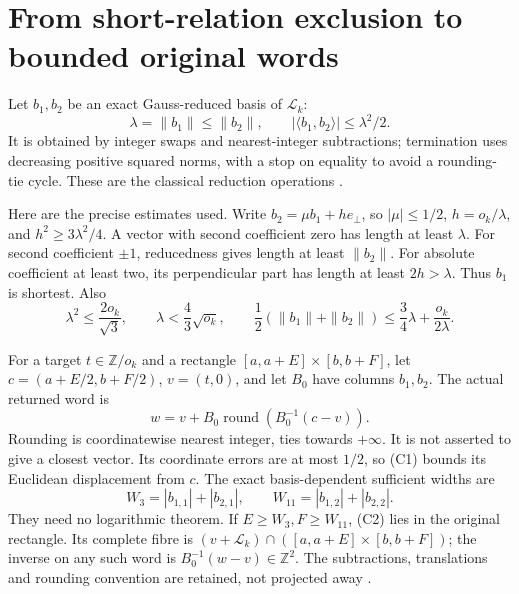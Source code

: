 \section{From short-relation exclusion to bounded original words}
Let $b_1,b_2$ be an exact Gauss-reduced basis of $\mathcal L_k$:
\[
 \lambda=\|b_1\|\le\|b_2\|,\qquad
 |\langle b_1,b_2\rangle|\le\lambda^2/2.
\]
It is obtained by integer swaps and nearest-integer subtractions; termination
uses decreasing positive squared norms, with a stop on equality to avoid a
rounding-tie cycle. These are the classical reduction operations
\cite[\S17.1, Theorem 17.1.2 and Algorithm 23]{Galbraith}.

Here are the precise estimates used. Write
$b_2=\mu b_1+h e_\perp$, so $|\mu|\le1/2$, $h=o_k/\lambda$, and
$h^2\ge3\lambda^2/4$. A vector with second coefficient zero has length at
least $\lambda$. For second coefficient $\pm1$, reducedness gives length
at least $\|b_2\|$. For absolute coefficient at least two, its perpendicular
part has length at least $2h>\lambda$. Thus $b_1$ is shortest. Also
\[
 \lambda^2\le\frac{2o_k}{\sqrt3},\qquad
 \lambda<\frac43\sqrt{o_k},\qquad
 \frac12(\|b_1\|+\|b_2\|)
 \le\frac34\lambda+\frac{o_k}{2\lambda}.                  \tag{C1}
\]

For a target $t\in\mathbb Z/o_k$ and a rectangle
$[a,a+E]\times[b,b+F]$, let $c=(a+E/2,b+F/2)$, $v=(t,0)$, and let
$B_0$ have columns $b_1,b_2$. The actual returned word is
\[
 \boxed{w=v+B_0\operatorname{round}(B_0^{-1}(c-v)).}        \tag{C2}
\]
Rounding is coordinatewise nearest integer, ties towards $+\infty$.
It is not asserted to give a closest vector. Its coordinate errors are at
most $1/2$, so (C1) bounds its Euclidean displacement from $c$.
The exact basis-dependent sufficient widths are
\[
 W_3=|b_{1,1}|+|b_{2,1}|,\qquad
 W_{11}=|b_{1,2}|+|b_{2,2}|.                               \tag{C3}
\]
They need no logarithmic theorem. If $E\ge W_3,F\ge W_{11}$, (C2) lies in
the original rectangle. Its complete fibre is
$(v+\mathcal L_k)\cap([a,a+E]\times[b,b+F])$; the inverse on any such word
is $B_0^{-1}(w-v)\in\mathbb Z^2$. The subtractions, translations and rounding
convention are retained, not projected away \cite[\S18.2]{Galbraith}.

